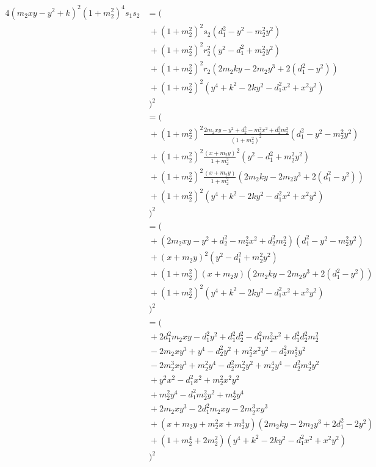 \documentclass[11pt]{article}
\begin{document}
\begin{align*}
  4 (m_2 x y - y^2 + k)^2 (1 + m_2^2)^4 s_1 s_2
  &= (\\
  & ~+ (1 + m_2^2)^2 s_2 (d_1^2 - y^2 - m_2^2 y^2)\\
  & ~+ (1 + m_2^2)^2 r_2^2 (y^2 - d_1^2 + m_2^2 y^2)\\
  & ~+ (1 + m_2^2)^2 r_2 (2 m_2 k y - 2 m_2 y^3 + 2 (d_1^2 - y^2))\\
  & ~+ (1 + m_2^2)^2 (y^4 + k^2 - 2 k y^2 - d_1^2 x^2 + x^2 y^2)\\
  & ~)^2\\
  &= (\\
  & ~+ (1 + m_2^2)^2 \frac{2 m_2 x y - y^2 + d_2^2 - m_2^2 x^2 + d_2^2 m_2^2}{(1 + m_2^2)^2} (d_1^2 - y^2 - m_2^2 y^2)\\
  & ~+ (1 + m_2^2)^2 \frac{(x + m_2 y)}{1 + m_2^2}^2 (y^2 - d_1^2 + m_2^2 y^2)\\
  & ~+ (1 + m_2^2)^2 \frac{(x + m_2 y)}{1 + m_2^2} (2 m_2 k y - 2 m_2 y^3 + 2 (d_1^2 - y^2))\\
  & ~+ (1 + m_2^2)^2 (y^4 + k^2 - 2 k y^2 - d_1^2 x^2 + x^2 y^2)\\
  & ~)^2\\
  &= (\\
  & ~+ (2 m_2 x y - y^2 + d_2^2 - m_2^2 x^2 + d_2^2 m_2^2) (d_1^2 - y^2 - m_2^2 y^2)\\
  & ~+ (x + m_2 y)^2 (y^2 - d_1^2 + m_2^2 y^2)\\
  & ~+ (1 + m_2^2) (x + m_2 y) (2 m_2 k y - 2 m_2 y^3 + 2 (d_1^2 - y^2))\\
  & ~+ (1 + m_2^2)^2 (y^4 + k^2 - 2 k y^2 - d_1^2 x^2 + x^2 y^2)\\
  & ~)^2\\
  &= (\\
  & ~+ 2 d_1^2 m_2 x y - d_1^2 y^2 + d_1^2 d_2^2 - d_1^2 m_2^2 x^2 + d_1^2 d_2^2 m_2^2\\
  & ~- 2 m_2 x y^3 + y^4 - d_2^2 y^2 + m_2^2 x^2 y^2 - d_2^2 m_2^2y^2\\
  & ~- 2 m_2^3 x y^3 + m_2^2 y^4 - d_2^2 m_2^2 y^2 + m_2^4 y^4 - d_2^2 m_2^4 y^2\\
  & ~+ y^2 x^2 - d_1^2 x^2 + m_2^2 x^2 y^2\\
  & ~+ m_2^2 y^4 - d_1^2 m_2^2 y^2 + m_2^4 y^4\\
  & ~+ 2 m_2 x y^3 - 2 d_1^2 m_2 x y - 2 m_2^3 x y^3\\
  & ~+ (x + m_2 y + m_2^2 x + m_2^3 y) (2 m_2 k y - 2 m_2 y^3 + 2 d_1^2 - 2 y^2)\\
  & ~+ (1 + m_2^4 + 2 m_2^2) (y^4 + k^2 - 2 k y^2 - d_1^2 x^2 + x^2 y^2)\\
  & ~)^2\\
\end{align*}
\end{document}
